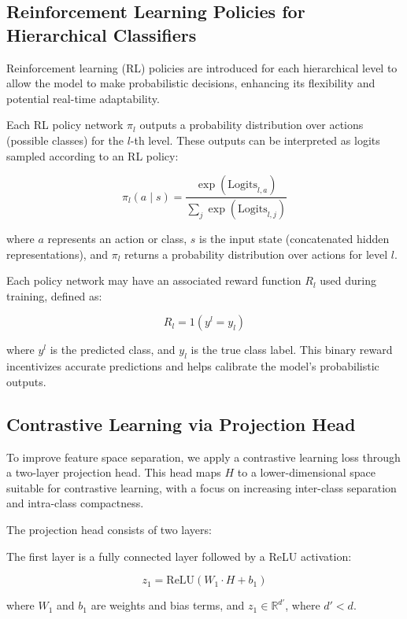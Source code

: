 \documentclass[9pt,a4paper,twoside]{rho-class/rho}
\begin{document}
    \subsection{Reinforcement Learning Policies for Hierarchical Classifiers}

Reinforcement learning (RL) policies are introduced for each hierarchical level to allow the model to make probabilistic decisions, enhancing its flexibility and potential real-time adaptability.

Each RL policy network \( \pi_l \) outputs a probability distribution over actions (possible classes) for the \( l \)-th level. These outputs can be interpreted as logits sampled according to an RL policy:

\[ \label{eq:policy_output}
\pi_l(a \mid s) = \frac{\exp(\text{Logits}_{l,a})}{\sum_{j} \exp(\text{Logits}_{l,j})}
\]

where \( a \) represents an action or class, \( s \) is the input state (concatenated hidden representations), and \( \pi_l \) returns a probability distribution over actions for level \( l \).

Each policy network may have an associated reward function \( R_l \) used during training, defined as:

\[ \label{eq:reward_function}
R_l = 1(y^l = y_l)
\]

where \( y^l \) is the predicted class, and \( y_l \) is the true class label. This binary reward incentivizes accurate predictions and helps calibrate the model’s probabilistic outputs.

             \subsection{Contrastive Learning via Projection Head}

To improve feature space separation, we apply a contrastive learning loss through a two-layer projection head. This head maps \( H \) to a lower-dimensional space suitable for contrastive learning, with a focus on increasing inter-class separation and intra-class compactness.

The projection head consists of two layers:

The first layer is a fully connected layer followed by a ReLU activation:

\[ \label{eq:first_layer}
z_1 = \text{ReLU}(W_1 \cdot H + b_1)
\]

where \( W_1 \) and \( b_1 \) are weights and bias terms, and \( z_1 \in \mathbb{R}^{d'} \), where \( d' < d \). 
\end{document}
